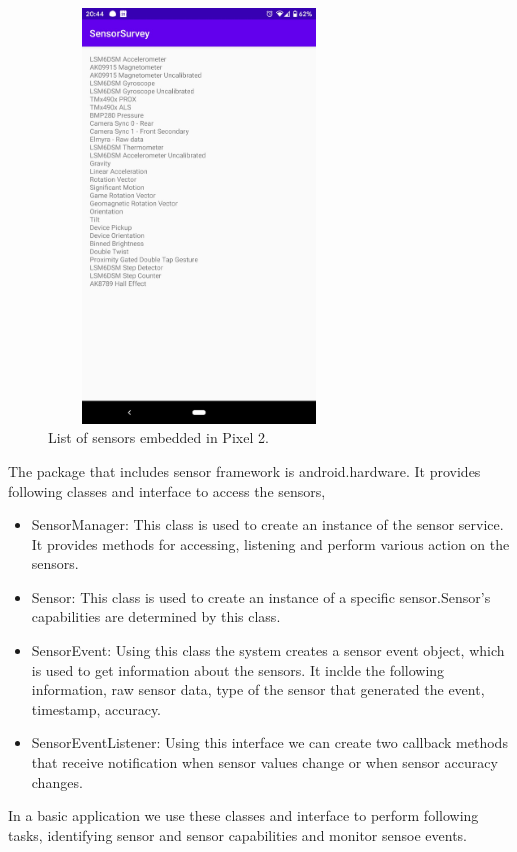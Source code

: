 \documentclass[conference]{IEEEtran}
\begin{document}
\begin{figure}
\centerline{\includegraphics[width=8cm, height=11cm]{fig1.jpg}}
\caption{List of sensors embedded in Pixel 2.}
\label{fig1}
\end{figure}

The package that includes sensor framework is android.hardware. It provides following classes and interface to access the sensors,
\begin{itemize}
    \item SensorManager: This class is used to create an instance of the sensor service. It provides methods for accessing, listening and perform various action on the sensors.
    \item Sensor: This class is used to create an instance of a specific sensor.Sensor's capabilities are determined by this class.
    \item SensorEvent: Using this class the system creates a sensor event object, which is used to get information about the sensors. It inclde the following information, raw sensor data, type of the sensor that generated the event, timestamp, accuracy.
    \item SensorEventListener: Using this interface we can create two callback methods that receive notification when sensor values change or when sensor accuracy changes.
\end{itemize}
In a basic application we use these classes and interface to perform following tasks, identifying sensor and sensor capabilities and monitor sensoe events.
\end{document}
